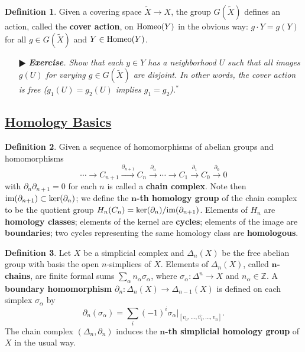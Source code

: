 \documentclass[11pt]{amsart}
\theoremstyle{definition}
\newtheorem*{definition*}{Definition}
\renewcommand\hat{\widehat}
\renewcommand\tilde{\widetilde}
\renewcommand\:{\colon}
\newcommand{\Z}{\mathds{Z}}
\newcommand{\1}{\mathds{1}}
\newcommand{\im}{\textnormal{im}}
\newcommand{\Homeo}{\textnormal{Homeo}}
\newcommand{\exc}[1]{\vspace{-2.5pt}\begin{itemize}[leftmargin=15pt]\item[$\RHD$] \textit{\textbf{Exercise}. #1}\end{itemize}}
\begin{document}
\begin{definition*}
	Given a covering space $\tilde X \to X$, the group $G(\tilde X)$ defines an action, called the \textbf{cover action}, on $\Homeo(Y)$ in the obvious way: $g \cdot Y = g(Y)$ for all $g \in G(\tilde X)$ and $Y \in \Homeo(Y)$.
\end{definition*}

\exc{Show that each $y \in Y$ has a neighborhood $U$ such that all images $g(U)$ for varying $g \in G(\tilde X)$ are disjoint. In other words, the cover action is free \textnormal{(}$g_1(U) = g_2(U)$ implies $g_1 = g_2$\textnormal{)}.$^*$}

\vskip20pt



\subsection*{\underline{Homology Basics}}

\begin{definition*}
	Given a sequence of homomorphisms of abelian groups and homomorphisms
		\[ \cdots \to C_{n+1} \xrightarrow{\partial_{n+1}} C_n \xrightarrow{\partial_n} \cdots \to C_1 \xrightarrow{\partial_1} C_0 \xrightarrow{\partial_0} 0 \]
	with $\partial_n\partial_{n+1} = 0$ for each $n$ is called a \textbf{chain complex}. Note then $\im(\partial_{n+1}) \subset \ker(\partial_n)$; we define the \textbf{$\boldsymbol{n}$-th homology group} of the chain complex to be the quotient group $H_n(C_n) = \ker(\partial_n)/\im(\partial_{n+1})$. Elements of $H_n$ are \textbf{homology classes}; elements of the kernel are \textbf{cycles}; elements of the image are \textbf{boundaries}; two cycles representing the same homology class are \textbf{homologous}.
\end{definition*}

\begin{definition*}
	Let $X$ be a simplicial complex and $\Delta_n(X)$ be the free abelian group with basis the open $n$-simplices of $X$. Elements of $\Delta_n(X)$, called \textbf{$\boldsymbol{n}$-chains}, are finite formal sums $\sum_\alpha n_\alpha \sigma_\alpha$, where $\sigma_\alpha\: \Delta^n \to X$ and $n_\alpha \in \Z$. A \textbf{boundary homomorphism} $\partial_n \: \Delta_n(X) \to \Delta_{n-1}(X)$ is defined on each simplex $\sigma_\alpha$ by 
		\[ \partial_n(\sigma_\alpha) = \sum_i (-1)^i \sigma_\alpha|_{[v_0, \dots, \hat{v_i}, \dots, v_n]}. \]
	The chain complex $(\Delta_n, \partial_n)$ induces the \textbf{$\boldsymbol{n}$-th simplicial homology group} of $X$ in the usual way.
\end{definition*}
\end{document}

